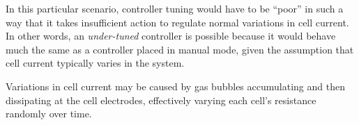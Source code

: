 In this particular scenario, controller tuning would have to be ``poor'' in such a way that it takes insufficient action to regulate normal variations in cell current.  In other words, an {\it under-tuned} controller is possible because it would behave much the same as a controller placed in manual mode, given the assumption that cell current typically varies in the system.

Variations in cell current may be caused by gas bubbles accumulating and then dissipating at the cell electrodes, effectively varying each cell's resistance randomly over time.











